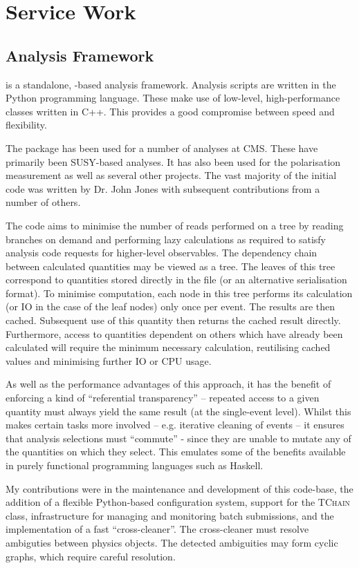 \chapter{Service Work}
\label{sec:service_work}
\section{ Analysis Framework}
 is a standalone, \root-based analysis framework. Analysis
scripts are written in the Python programming language. These make use of
low-level, high-performance classes written in C++. This provides a good
compromise between speed and flexibility.

The  package has been used for a number of analyses at
\ac{CMS}. These have primarily been \ac{SUSY}-based analyses. It has also been
used for the \PW polarisation measurement as well as several other projects. The
vast majority of the initial code was written by Dr. John Jones with subsequent
contributions from a number of others.

The  code aims to minimise the number of reads performed on a \root tree
by reading branches on demand and performing lazy calculations as required to
satisfy analysis code requests for higher-level observables. The dependency
chain between calculated quantities may be viewed as a tree. The leaves of this
tree correspond to quantities stored directly in the \root file (or an
alternative serialisation format). To minimise computation, each node in this
tree performs its calculation (or \ac{IO} in the case of the leaf nodes) only
once per event. The results are then cached. Subsequent use of this quantity
then returns the cached result directly. Furthermore, access to quantities
dependent on others which have already been calculated will require the minimum
necessary calculation, reutilising cached values and minimising further \ac{IO}
or CPU usage.

As well as the performance advantages of this approach, it has the benefit of
enforcing a kind of ``referential transparency'' -- repeated access to a given
quantity must always yield the same result (at the single-event level). Whilst
this makes certain tasks more involved -- e.g. iterative cleaning of events --
it ensures that analysis selections must ``commute'' - since they are unable to
mutate any of the quantities on which they select. This emulates some of the
benefits available in purely functional programming languages such as Haskell.

My contributions were in the maintenance and development of this code-base, the
addition of a flexible Python-based configuration system, support for the \root
\textsc{TChain} class, infrastructure for managing and monitoring batch
submissions, and the implementation of a fast ``cross-cleaner''. The
cross-cleaner must resolve ambiguties between physics objects. The detected
ambiguities may form cyclic graphs, which require careful resolution.

